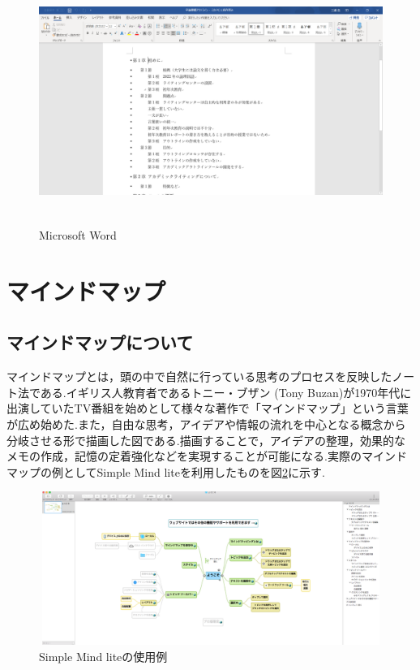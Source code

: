 \documentclass[a4j,12pt]{jarticle}
\begin{document}
\begin{figure}[H]
\begin{center}
 \includegraphics[clip,width=120mm,height=80mm]{figure/word.png}
 \end{center}
 \caption{Microsoft Word}
 \label{fig:d}
\end{figure}

\newpage
\section{マインドマップ}
\subsection{マインドマップについて}
マインドマップとは，頭の中で自然に行っている思考のプロセスを反映したノート法である.イギリス人教育者であるトニー・ブザン (Tony Buzan)が1970年代に出演していたTV番組を始めとして様々な著作で「マインドマップ」という言葉が広め始めた\cite{ren4}.また，自由な思考，アイデアや情報の流れを中心となる概念から分岐させる形で描画した図である.描画することで，アイデアの整理，効果的なメモの作成，記憶の定着強化などを実現することが可能になる.実際のマインドマップの例としてSimple Mind liteを利用したものを図\ref{fig:e}に示す.
\begin{figure}[h]
\begin{center}
 \includegraphics[clip,width=130mm,height=50mm]{figure/maindmap.png}
\end{center}
 \caption{Simple Mind liteの使用例}
 \label{fig:e}
\end{figure}
\newpage
\end{document}
